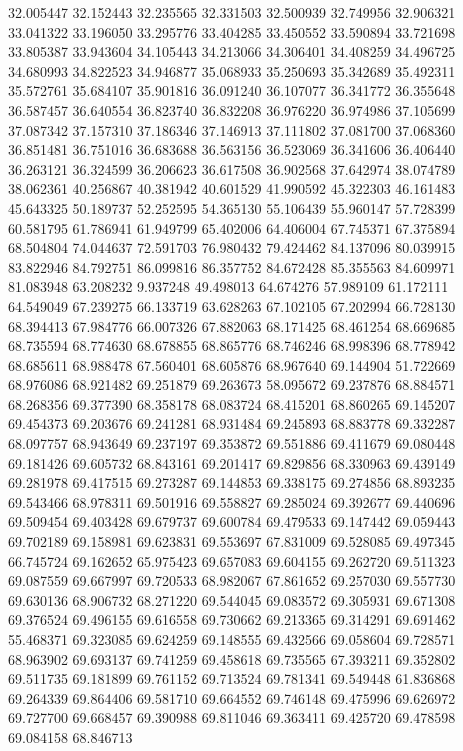 32.005447
32.152443
32.235565
32.331503
32.500939
32.749956
32.906321
33.041322
33.196050
33.295776
33.404285
33.450552
33.590894
33.721698
33.805387
33.943604
34.105443
34.213066
34.306401
34.408259
34.496725
34.680993
34.822523
34.946877
35.068933
35.250693
35.342689
35.492311
35.572761
35.684107
35.901816
36.091240
36.107077
36.341772
36.355648
36.587457
36.640554
36.823740
36.832208
36.976220
36.974986
37.105699
37.087342
37.157310
37.186346
37.146913
37.111802
37.081700
37.068360
36.851481
36.751016
36.683688
36.563156
36.523069
36.341606
36.406440
36.263121
36.324599
36.206623
36.617508
36.902568
37.642974
38.074789
38.062361
40.256867
40.381942
40.601529
41.990592
45.322303
46.161483
45.643325
50.189737
52.252595
54.365130
55.106439
55.960147
57.728399
60.581795
61.786941
61.949799
65.402006
64.406004
67.745371
67.375894
68.504804
74.044637
72.591703
76.980432
79.424462
84.137096
80.039915
83.822946
84.792751
86.099816
86.357752
84.672428
85.355563
84.609971
81.083948
63.208232
9.937248
49.498013
64.674276
57.989109
61.172111
64.549049
67.239275
66.133719
63.628263
67.102105
67.202994
66.728130
68.394413
67.984776
66.007326
67.882063
68.171425
68.461254
68.669685
68.735594
68.774630
68.678855
68.865776
68.746246
68.998396
68.778942
68.685611
68.988478
67.560401
68.605876
68.967640
69.144904
51.722669
68.976086
68.921482
69.251879
69.263673
58.095672
69.237876
68.884571
68.268356
69.377390
68.358178
68.083724
68.415201
68.860265
69.145207
69.454373
69.203676
69.241281
68.931484
69.245893
68.883778
69.332287
68.097757
68.943649
69.237197
69.353872
69.551886
69.411679
69.080448
69.181426
69.605732
68.843161
69.201417
69.829856
68.330963
69.439149
69.281978
69.417515
69.273287
69.144853
69.338175
69.274856
68.893235
69.543466
68.978311
69.501916
69.558827
69.285024
69.392677
69.440696
69.509454
69.403428
69.679737
69.600784
69.479533
69.147442
69.059443
69.702189
69.158981
69.623831
69.553697
67.831009
69.528085
69.497345
66.745724
69.162652
65.975423
69.657083
69.604155
69.262720
69.511323
69.087559
69.667997
69.720533
68.982067
67.861652
69.257030
69.557730
69.630136
68.906732
68.271220
69.544045
69.083572
69.305931
69.671308
69.376524
69.496155
69.616558
69.730662
69.213365
69.314291
69.691462
55.468371
69.323085
69.624259
69.148555
69.432566
69.058604
69.728571
68.963902
69.693137
69.741259
69.458618
69.735565
67.393211
69.352802
69.511735
69.181899
69.761152
69.713524
69.781341
69.549448
61.836868
69.264339
69.864406
69.581710
69.664552
69.746148
69.475996
69.626972
69.727700
69.668457
69.390988
69.811046
69.363411
69.425720
69.478598
69.084158
68.846713
